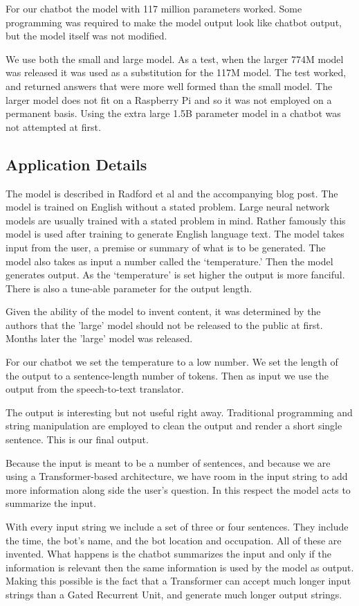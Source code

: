 For our chatbot the model with 117 million parameters worked. Some programming was required to make the model output look like chatbot output, but the model itself was not modified.

We use both the small and large model. As a test, when the larger 774M model was released it was used as a substitution for the 117M model. The test worked, and returned answers that were more well formed than the small model. The larger model does not fit on a Raspberry Pi and so it was not employed on a permanent basis. Using the extra large 1.5B parameter model in a chatbot was not attempted at first.

\subsection{Application Details}
The model is described in Radford et al \cite{radford2019language} and the accompanying blog post. The model is trained on English without a stated problem. Large neural network models are usually trained with a stated problem in mind. Rather famously this model is used after training to generate English language text. The model takes input from the user, a premise or summary of what is to be generated. The model also takes as input a number called the `temperature.' Then the model generates output. As the `temperature' is set higher the output is more fanciful. There is also a tune-able parameter for the output length. 

Given the ability of the model to invent content, it was determined by the authors that the 'large' model should not be released to the public at first. Months later the 'large' model was released. 

For our chatbot we set the temperature to a low number. We set the length of the output to a sentence-length number of tokens. Then as input we use the output from the speech-to-text translator.

The output is interesting but not useful right away. Traditional programming and string manipulation are employed to clean the output and render a short single sentence. This is our final output.

Because the input is meant to be a number of sentences, and because we are using a Transformer-based architecture, we have room in the input string to add more information along side the user's question. In this respect the model acts to summarize the input. 

With every input string we include a set of three or four sentences. They include the time, the bot's name, and the bot location and occupation. All of these are invented. What happens is the chatbot summarizes the input and only if the information is relevant then the same information is used by the model as output. Making this possible is the fact that a Transformer can accept much longer input strings than a Gated Recurrent Unit, and generate much longer output strings.

